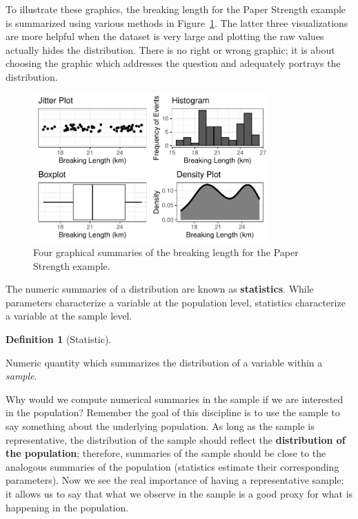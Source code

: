 \documentclass[
  letterpaper,
  DIV=11,
  numbers=noendperiod]{scrreprt}
\theoremstyle{plain}
\theoremstyle{definition}
\theoremstyle{definition}
\newtheorem{definition}{Definition}[chapter]
\theoremstyle{remark}
\begin{document}
To illustrate these graphics, the breaking length for the Paper Strength
example is summarized using various methods in
Figure~\ref{fig-summaries-univariate}. The latter three visualizations
are more helpful when the dataset is very large and plotting the raw
values actually hides the distribution. There is no right or wrong
graphic; it is about choosing the graphic which addresses the question
and adequately portrays the distribution.

\begin{figure}

{\centering \includegraphics[width=0.8\textwidth,height=\textheight]{./images/fig-summaries-univariate-1.pdf}

}

\caption{\label{fig-summaries-univariate}Four graphical summaries of the
breaking length for the Paper Strength example.}

\end{figure}

The numeric summaries of a distribution are known as
\textbf{statistics}. While parameters characterize a variable at the
population level, statistics characterize a variable at the sample
level.

\begin{definition}[Statistic]\protect\hypertarget{def-statistic}{}\label{def-statistic}

Numeric quantity which summarizes the distribution of a variable within
a \emph{sample}.

\end{definition}

Why would we compute numerical summaries in the sample if we are
interested in the population? Remember the goal of this discipline is to
use the sample to say something about the underlying population. As long
as the sample is representative, the distribution of the sample should
reflect the \textbf{distribution of the population}; therefore,
summaries of the sample should be close to the analogous summaries of
the population (statistics estimate their corresponding parameters). Now
we see the real importance of having a representative sample; it allows
us to say that what we observe in the sample is a good proxy for what is
happening in the population.
\end{document}
